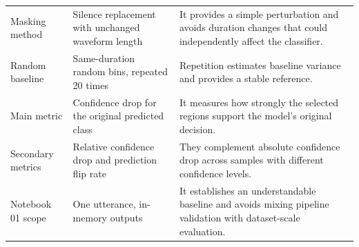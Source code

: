 \documentclass[11pt]{article}
\begin{document}
\begin{longtable}{p{} p{} p{}}
Masking method & Silence replacement with unchanged waveform length & It provides a simple perturbation and avoids duration changes that could independently affect the classifier. \\

Random baseline & Same-duration random bins, repeated 20 times & Repetition estimates baseline variance and provides a stable reference. \\

Main metric & Confidence drop for the original predicted class & It measures how strongly the selected regions support the model's original decision. \\

Secondary metrics & Relative confidence drop and prediction flip rate & They complement absolute confidence drop across samples with different confidence levels. \\

Notebook 01 scope & One utterance, in-memory outputs & It establishes an understandable baseline and avoids mixing pipeline validation with dataset-scale evaluation. \\
\bottomrule
\end{longtable}
\end{document}
